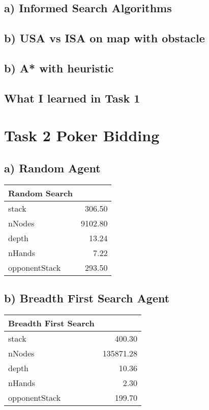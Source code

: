\documentclass{article}
\begin{document}
\subsection{a) Informed Search Algorithms}

\subsection{b) USA vs ISA on map with obstacle}

\subsection{b) A* with heuristic}

\subsection{What I learned in Task 1}

\newpage
\section{Task 2 Poker Bidding}

\subsection{a) Random Agent}
\begin{tabular}{lr}
    \toprule
    {Random Search} &        \\
    \midrule
    stack         &   306.50 \\
    nNodes        &  9102.80 \\
    depth         &    13.24 \\
    nHands        &     7.22 \\
    opponentStack &   293.50 \\
    \bottomrule
\end{tabular}

\subsection{b) Breadth First Search Agent}
\begin{tabular}{lr}
    \toprule
    {Breadth First Search} &   \\
    \midrule
    stack         &     400.30 \\
    nNodes        &  135871.28 \\
    depth         &      10.36 \\
    nHands        &       2.30 \\
    opponentStack &     199.70 \\
    \bottomrule
\end{tabular}
\end{document}
